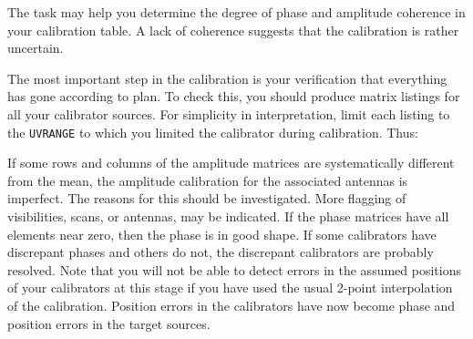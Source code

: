      The task {\tt {}} may help you determine the degree of
phase and amplitude coherence in your calibration table.  A lack of
coherence suggests that the calibration is rather uncertain.

     The most important step in the calibration is your verification
that everything has gone according to plan.  To check this, you should
produce matrix listings for all your calibrator sources.  For
simplicity in interpretation, limit each listing to the {\tt UVRANGE}
to which you limited the calibrator during calibration.  Thus:

     If some rows and columns of the amplitude matrices are
systematically different from the mean, the amplitude calibration for
the associated antennas is imperfect.  The reasons for this should be
investigated.  More flagging of visibilities, scans, or antennas, may
be indicated.  If the phase matrices have all elements near zero, then
the phase  is in good shape.  If some calibrators
have discrepant phases and others do not, the discrepant calibrators
are probably resolved.  Note that you will not be able to detect
errors in the assumed positions of your calibrators at this stage if
you have used the usual 2-point interpolation of the calibration.
Position errors in the calibrators have now become phase and position
errors in the target sources.

